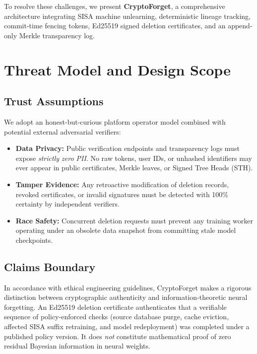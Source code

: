 \documentclass[10pt,journal,compsoc]{IEEEtran}
\begin{document}
To resolve these challenges, we present \textbf{CryptoForget}, a comprehensive architecture integrating SISA machine unlearning, deterministic lineage tracking, commit-time fencing tokens, Ed25519 signed deletion certificates, and an append-only Merkle transparency log.

\section{Threat Model and Design Scope}
\subsection{Trust Assumptions}
We adopt an honest-but-curious platform operator model combined with potential external adversarial verifiers:
\begin{itemize}
    \item \textbf{Data Privacy:} Public verification endpoints and transparency logs must expose \textit{strictly zero PII}. No raw tokens, user IDs, or unhashed identifiers may ever appear in public certificates, Merkle leaves, or Signed Tree Heads (STH).
    \item \textbf{Tamper Evidence:} Any retroactive modification of deletion records, revoked certificates, or invalid signatures must be detected with 100\% certainty by independent verifiers.
    \item \textbf{Race Safety:} Concurrent deletion requests must prevent any training worker operating under an obsolete data snapshot from committing stale model checkpoints.
\end{itemize}

\subsection{Claims Boundary}
In accordance with ethical engineering guidelines, CryptoForget makes a rigorous distinction between cryptographic authenticity and information-theoretic neural forgetting. An Ed25519 deletion certificate authenticates that a verifiable sequence of policy-enforced checks (source database purge, cache eviction, affected SISA suffix retraining, and model redeployment) was completed under a published policy version. It does \textit{not} constitute mathematical proof of zero residual Bayesian information in neural weights.
\end{document}
